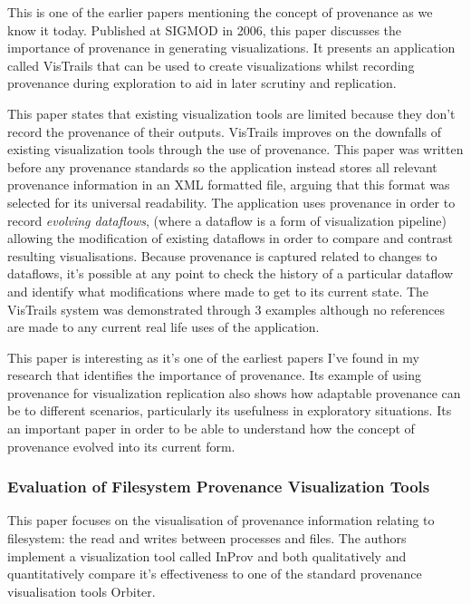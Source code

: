 This is one of the earlier papers mentioning the concept of provenance as we know it today. Published at SIGMOD in 2006, this paper discusses the importance of provenance in generating visualizations. It presents an application called VisTrails that can be used to create visualizations whilst recording provenance during exploration to aid in later scrutiny and replication.

This paper states that existing visualization tools are limited because they don't record the provenance of their outputs. VisTrails improves on the downfalls of existing visualization tools through the use of provenance. This paper was written before any provenance standards\cite{Macko2012} so the application instead stores all relevant provenance information in an XML formatted file, arguing that this format was selected for its universal readability. The application uses provenance in order to record \textit{evolving dataflows}, (where a dataflow is a form of visualization pipeline) allowing the modification of existing dataflows in order to compare and contrast resulting visualisations. Because provenance is captured related to changes to dataflows, it's possible at any point to check the history of a particular dataflow and identify what modifications where made to get to its current state. The VisTrails system was demonstrated through 3 examples although no references are made to any current real life uses of the application.

This paper is interesting as it's one of the earliest papers I've found in my research that identifies the importance of provenance. Its example of using provenance for visualization replication also shows how adaptable provenance can be to different scenarios, particularly its usefulness in exploratory situations. Its an important paper in order to be able to understand how the concept of provenance evolved into its current form.

\subsubsection{Evaluation of Filesystem Provenance Visualization Tools\cite{Borkin2013}}
\label{sub:evaluation_of_filesystem_provenance_visualization_toolsborkin2013}

This paper focuses on the visualisation of provenance information relating to filesystem: the read and writes between processes and files. The authors implement a visualization tool called InProv and both qualitatively and quantitatively compare it's effectiveness to one of the standard provenance visualisation tools Orbiter\cite{Seltzer2011}.

